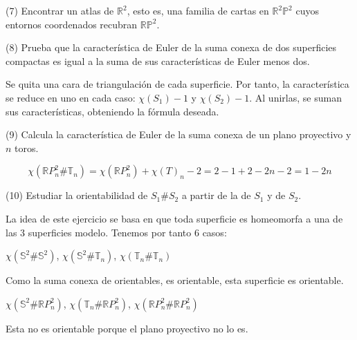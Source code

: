 \documentclass[
  a4paper,
  spanish,
  12pt,
]{scrartcl}
\begin{document}
\begin{ejer}
(7) Encontrar un atlas de $\mathbb{R}^{2}$, esto es, una familia de cartas en $\mathbb{R}^{2} \mathbb{P}^{2}$ cuyos entornos coordenados recubran $\mathbb{R} \mathbb{P}^{2}$.\\
\end{ejer}

\begin{ejer}
(8) Prueba que la característica de Euler de la suma conexa de dos superficies compactas es igual a la suma de sus características de Euler menos dos.\\
\end{ejer}

\begin{sol}
	Se quita una cara de triangulación de cada superficie. Por tanto, la característica se reduce en uno en cada caso:
	$\chi(S_1) -1$ y $\chi(S_2) -1$. Al unirlas, se suman sus características, obteniendo la fórmula deseada.
\end{sol}

\begin{ejer}
(9) Calcula la característica de Euler de la suma conexa de un plano proyectivo y $n$ toros.\\
\end{ejer}

\begin{sol}
$$
\chi(\mathbb{R}P^2_n \# \mathbb{T}_n) = \chi(\mathbb{R}P^2_n) + \chi(T)_n - 2 = 2 - 1 + 2 - 2n - 2 = 1 -2n
$$
\end{sol}

\begin{ejer}
(10) Estudiar la orientabilidad de $S_{1} \# S_{2}$ a partir de la de $S_{1}$ y de $S_{2}$.\\
\end{ejer}

\begin{sol}
La idea de este ejercicio se basa en que toda superficie es homeomorfa a una de las 3 superficies modelo.
Tenemos por tanto 6 casos:

$\chi(\mathbb{S}^2 \# \mathbb{S}^2)$, $\chi(\mathbb{S}^2 \# \mathbb{T}_n)$, $\chi(\mathbb{T}_n \# \mathbb{T}_n)$

Como la suma conexa de orientables, es orientable, esta superficie es orientable.

$\chi(\mathbb{S}^2 \# \mathbb{R}P^2_n)$, $\chi(\mathbb{T}_n \# \mathbb{R}P^2_n)$, $\chi(\mathbb{R}P^2_n \# \mathbb{R}P^2_n)$

Esta no es orientable porque el plano proyectivo no lo es.

\end{sol}
\end{document}
